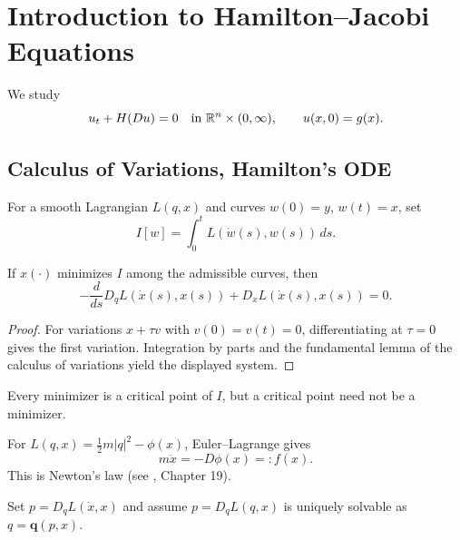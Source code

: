 \section{Introduction to Hamilton--Jacobi Equations}
\label{sec:hamilton-jacobi-intro}

We study
\[
u_t+H(Du)=0\quad\text{in }\mathbb{R}^n\times(0,\infty),\qquad
u(x,0)=g(x).
\]

\subsection{Calculus of Variations, Hamilton's ODE}
\label{sec:calculus-of-variations-hamiltons-ode}

For a smooth Lagrangian $L(q,x)$ and curves $w(0)=y$, $w(t)=x$, set
\[
I[w]=\int_0^tL(\dot w(s),w(s))\,ds.
\]

\begin{theorem}
\label{thm:euler-lagrange-equations}
If $x(\cdot)$ minimizes $I$ among the admissible curves, then
\[
-\frac d{ds}D_qL(\dot x(s),x(s))+D_xL(\dot x(s),x(s))=0.
\]
\end{theorem}

\begin{proof}
\sketch For variations $x+\tau v$ with $v(0)=v(t)=0$, differentiating at
$\tau=0$ gives the first variation. Integration by parts and the fundamental
lemma of the calculus of variations yield the displayed system.
\end{proof}

\begin{remark}
\label{rem:critical-point-vs-minimizer}

Every minimizer is a critical point of $I$, but a critical point need not be a
minimizer.
\end{remark}

\begin{example}
\label{ex:newtons-law-lagrangian}

For $L(q,x)=\frac12m|q|^2-\phi(x)$, Euler--Lagrange gives
\[
m\ddot x=-D\phi(x)=:f(x).
\]
This is Newton's law (see \cite{FeynmanLeightonSands1966}, Chapter 19).
\end{example}

Set $p=D_qL(\dot x,x)$ and assume $p=D_qL(q,x)$ is uniquely solvable as
$q=\mathbf q(p,x)$.

